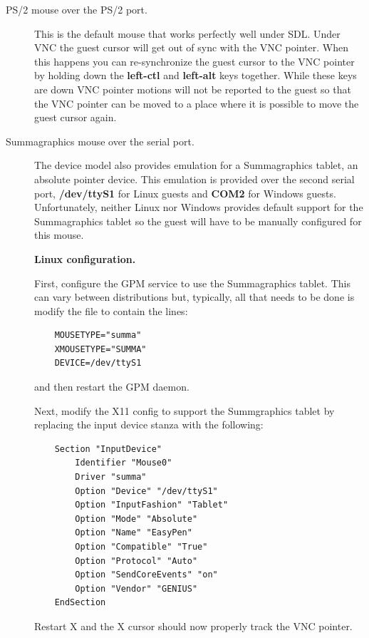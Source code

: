 \documentclass[11pt,twoside,final,openright]{report}
\begin{document}
\begin{description}
\item[PS/2 mouse over the PS/2 port.]
This is the default mouse
that works perfectly well under SDL.
Under VNC the guest cursor will get
out of sync with the VNC pointer.
When this happens you can re-synchronize
the guest cursor to the VNC pointer by
holding down the
\textbf{left-ctl}
and
\textbf{left-alt}
keys together.
While these keys are down VNC pointer motions
will not be reported to the guest so
that the VNC pointer can be moved
to a place where it is possible
to move the guest cursor again.

\item[Summagraphics mouse over the serial port.]
The device model also provides emulation
for a Summagraphics tablet,
an absolute pointer device.
This emulation is provided over the second
serial port,
\textbf{/dev/ttyS1}
for Linux guests and
\textbf{COM2}
for Windows guests.
Unfortunately,
neither Linux nor Windows provides
default support for the Summagraphics
tablet so the guest will have to be
manually configured for this mouse.

\textbf{Linux configuration.}

First,
configure the GPM service to use the Summagraphics tablet.
This can vary between distributions but,
typically,
all that needs to be done is modify the file
 to contain the lines:

{\small
\begin{verbatim}
    MOUSETYPE="summa"
    XMOUSETYPE="SUMMA"
    DEVICE=/dev/ttyS1
\end{verbatim}
}

and then restart the GPM daemon.

Next,
modify the X11 config
to support the Summgraphics tablet by replacing
the input device stanza with the following:

{\small
\begin{verbatim}
    Section "InputDevice"
        Identifier "Mouse0"
        Driver "summa"
        Option "Device" "/dev/ttyS1"
        Option "InputFashion" "Tablet"
        Option "Mode" "Absolute"
        Option "Name" "EasyPen"
        Option "Compatible" "True"
        Option "Protocol" "Auto"
        Option "SendCoreEvents" "on"
        Option "Vendor" "GENIUS"
    EndSection
\end{verbatim}
}

Restart X and the X cursor should now properly
track the VNC pointer.



\end{description}
\end{document}
